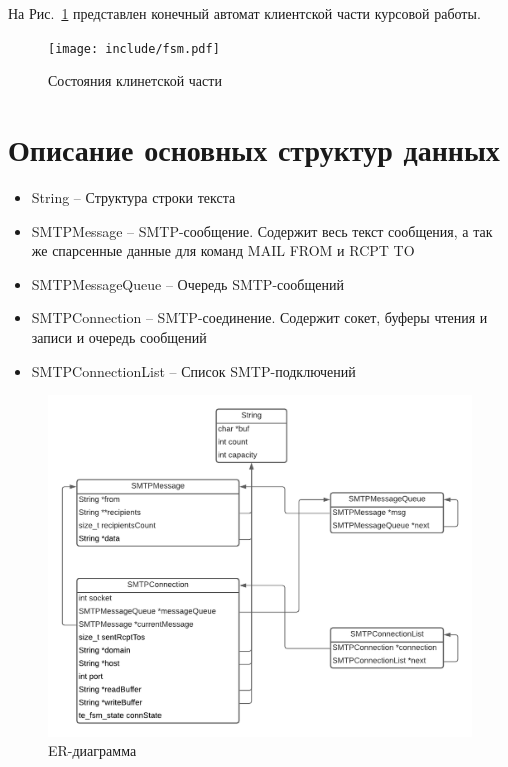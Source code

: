 \documentclass[a4paper,12pt]{report}
\begin{document}
На Рис.~\ref{fig:fsm-client} представлен конечный автомат клиентской части курсовой работы.

\begin{figure}
    \centering
    \texttt{[image: include/fsm.pdf]}
    \caption{Состояния клинетской части}
    \label{fig:fsm-client}
\end{figure}

\section{Описание основных структур данных}
\begin{itemize}
    \item String -- Структура строки текста
    \item SMTPMessage -- SMTP-сообщение. Содержит весь текст сообщения, а так же спарсенные данные для команд MAIL FROM и RCPT TO
    \item SMTPMessageQueue -- Очередь SMTP-сообщений
    \item SMTPConnection -- SMTP-соединение. Содержит сокет, буферы чтения и записи и очередь сообщений
    \item SMTPConnectionList -- Список SMTP-подключений
\end{itemize}

\begin{figure}
    \centering
    \includegraphics[width=\textwidth]{include-git/SMTP-ER.pdf}
    \caption{ER-диаграмма}
    \label{fig:er}
\end{figure}
\end{document}
